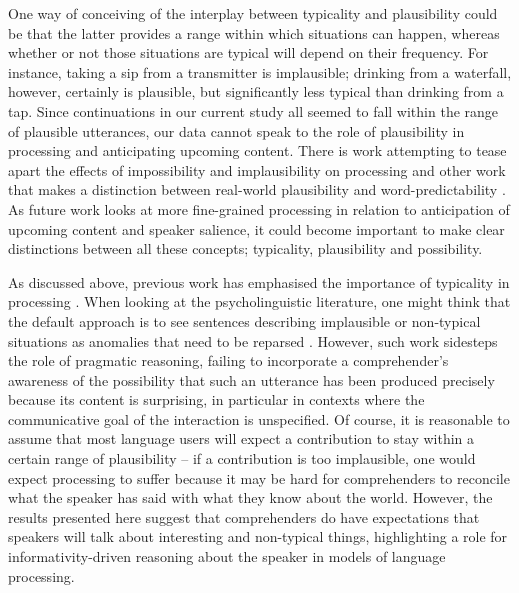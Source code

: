 \documentclass[output=paper,colorlinks,citecolor=brown]{langscibook}
\begin{document}
One way of conceiving of the interplay between typicality and plausibility could be that the latter provides a range within which situations can happen, whereas whether or not those situations are typical will depend on their frequency. For instance, taking a sip from a transmitter is implausible; drinking from a waterfall, however, certainly is plausible, but significantly less typical than drinking from a tap. Since continuations in our current study all seemed to fall within the range of plausible utterances, our data cannot speak to the role of plausibility in processing and anticipating upcoming content. There is work attempting to tease apart the effects of impossibility and implausibility on processing \citep[see e.g.][]{WarrenMcConnell2007} and other work that makes a distinction between real-world plausibility and word-predictability \citep[e.g.][]{AlbuEtAl2023}. As future work looks at more fine-grained processing in relation to anticipation of upcoming content and speaker salience, it could become important to make clear distinctions between all these concepts; typicality, plausibility and possibility. 

As discussed above, previous work has emphasised the importance of typicality in processing \citep[e.g.][]{MarksMiller1964, KutasHillyard1980, Morris1994, KamideHaywood2003}. When looking at the psycholinguistic literature, one might think that the default approach is to see sentences describing implausible or non-typical situations as anomalies that need to be reparsed \citep[see e.g.][]{CaiPickering2022}. However, such work sidesteps the role of pragmatic reasoning, failing to incorporate a comprehender’s awareness of the possibility that such an utterance has been produced precisely because its content is surprising, in particular in contexts where the communicative goal of the interaction is unspecified. Of course, it is reasonable to assume that most language users will expect a contribution to stay within a certain range of plausibility – if a contribution is too implausible, one would expect processing to suffer because it may be hard for comprehenders to reconcile what the speaker has said with what they know about the world. However, the results presented here suggest that comprehenders do have expectations that speakers will talk about interesting and non-typical things, highlighting a role for informativity-driven reasoning about the speaker in models of language processing.

  
\end{document}
